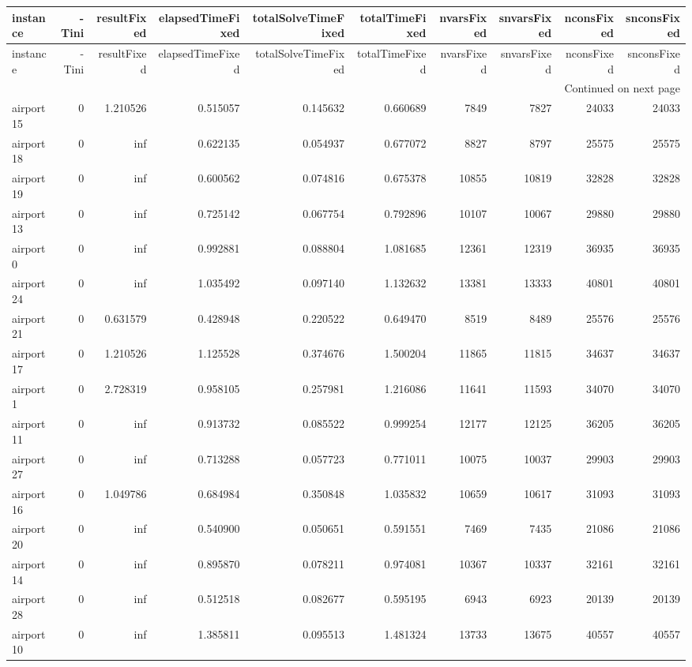
\begin{longtable}{|l|r|r|r|r|r|r|r|r|r|}
\toprule
instance & -Tini & resultFixed & elapsedTimeFixed & totalSolveTimeFixed & totalTimeFixed & nvarsFixed & snvarsFixed & nconsFixed & snconsFixed \\
\midrule
\endfirsthead
\toprule
instance & -Tini & resultFixed & elapsedTimeFixed & totalSolveTimeFixed & totalTimeFixed & nvarsFixed & snvarsFixed & nconsFixed & snconsFixed \\
\midrule
\endhead
\midrule
\multicolumn{10}{r}{Continued on next page} \\
\midrule
\endfoot
\bottomrule
\endlastfoot
airport15 & 0 & 1.210526 & 0.515057 & 0.145632 & 0.660689 & 7849 & 7827 & 24033 & 24033 \\
airport18 & 0 & inf & 0.622135 & 0.054937 & 0.677072 & 8827 & 8797 & 25575 & 25575 \\
airport19 & 0 & inf & 0.600562 & 0.074816 & 0.675378 & 10855 & 10819 & 32828 & 32828 \\
airport13 & 0 & inf & 0.725142 & 0.067754 & 0.792896 & 10107 & 10067 & 29880 & 29880 \\
airport0 & 0 & inf & 0.992881 & 0.088804 & 1.081685 & 12361 & 12319 & 36935 & 36935 \\
airport24 & 0 & inf & 1.035492 & 0.097140 & 1.132632 & 13381 & 13333 & 40801 & 40801 \\
airport21 & 0 & 0.631579 & 0.428948 & 0.220522 & 0.649470 & 8519 & 8489 & 25576 & 25576 \\
airport17 & 0 & 1.210526 & 1.125528 & 0.374676 & 1.500204 & 11865 & 11815 & 34637 & 34637 \\
airport1 & 0 & 2.728319 & 0.958105 & 0.257981 & 1.216086 & 11641 & 11593 & 34070 & 34070 \\
airport11 & 0 & inf & 0.913732 & 0.085522 & 0.999254 & 12177 & 12125 & 36205 & 36205 \\
airport27 & 0 & inf & 0.713288 & 0.057723 & 0.771011 & 10075 & 10037 & 29903 & 29903 \\
airport16 & 0 & 1.049786 & 0.684984 & 0.350848 & 1.035832 & 10659 & 10617 & 31093 & 31093 \\
airport20 & 0 & inf & 0.540900 & 0.050651 & 0.591551 & 7469 & 7435 & 21086 & 21086 \\
airport14 & 0 & inf & 0.895870 & 0.078211 & 0.974081 & 10367 & 10337 & 32161 & 32161 \\
airport28 & 0 & inf & 0.512518 & 0.082677 & 0.595195 & 6943 & 6923 & 20139 & 20139 \\
airport10 & 0 & inf & 1.385811 & 0.095513 & 1.481324 & 13733 & 13675 & 40557 & 40557 \\

\end{longtable}
